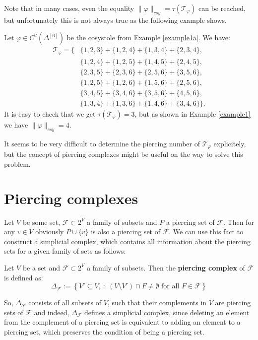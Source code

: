 Note that in many cases, even the equality \(\|\varphi\|_{csy}=\tau(\mathcal{T}_{\varphi})\) can be reached, but unfortunately this is not always true as the following example shows.

\begin{expl}
Let \(\varphi\in C^2(\Delta^{[6]})\) be the cosystole from Example \ref{example1a}. We have:
\begin{align*}
\mathcal{T}_{\varphi}=\{&\{1,2,3\}+\{1,2,4\}+\{1,3,4\}+\{2,3,4\},\\
&\{1,2,4\}+\{1,2,5\}+\{1,4,5\}+\{2,4,5\},\\
&\{2,3,5\}+\{2,3,6\}+\{2,5,6\}+\{3,5,6\},\\
&\{1,2,5\}+\{1,2,6\}+\{1,5,6\}+\{2,5,6\},\\
&\{3,4,5\}+\{3,4,6\}+\{3,5,6\}+\{4,5,6\},\\
&\{1,3,4\}+\{1,3,6\}+\{1,4,6\}+\{3,4,6\}\}.
\end{align*}
It is easy to check that we get \(\tau(\mathcal{T}_{\varphi})=3\), but as shown in Example \ref{example1} we have \(\|\varphi\|_{csy}=4\).
\end{expl}

It seems to be very difficult to determine the piercing number of \(\mathcal{T}_{\varphi}\) explicitely, but the concept of piercing complexes might be useful on the way to solve this problem.

\section{Piercing complexes}

Let \(V\) be some set, \(\mathcal{F}\subset 2^V\) a family of subsets and \(P\) a piercing set of \(\mathcal{F}\). Then for any \(v\in V\) obviously \(P\cup\{v\}\) is also a piercing set of \(\mathcal{F}\). We can use this fact to construct a simplicial complex, which contains all information about the piercing sets for a given family of sets as follows:

\begin{defi}
Let \(V\) be a set and \(\mathcal{F}\subset 2^V\) a family of subsets. Then the \textbf{piercing complex} of \(\mathcal{F}\) is defined as:
\[
\Delta_{\mathcal{F}}:=\left\{V'\subseteq V,\text{ : }(V\setminus V')\cap F\neq\emptyset\text{ for all }F\in\mathcal{F}\right\}
\]
\end{defi}
So, \(\Delta_{\mathcal{F}}\) consists of all subsets of \(V\), such that their complements in \(V\) are piercing sets of \(\mathcal{F}\) and indeed, \(\Delta_{\mathcal{F}}\) defines a simplicial complex, since deleting an element from the complement of a piercing set is equivalent to adding an element to a piercing set, which preserves the condition of being a piercing set.\\

